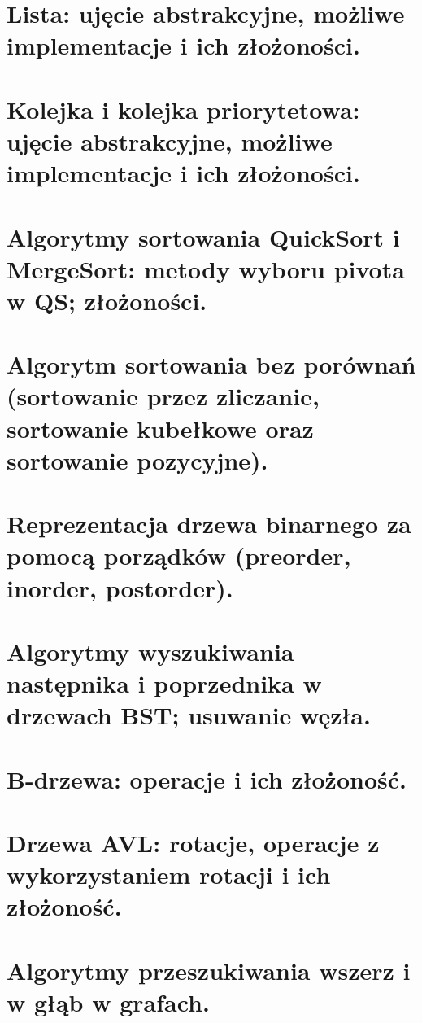 \documentclass[12pt]{article}
\begin{document}
    \section{Lista: ujęcie abstrakcyjne, możliwe implementacje i ich złożoności.}
    \section{Kolejka i kolejka priorytetowa: ujęcie abstrakcyjne, możliwe implementacje i ich złożoności.}

    \newpage

    \section{Algorytmy sortowania QuickSort i MergeSort: metody wyboru pivota w QS; złożoności.}

    \newpage

    \section{Algorytm sortowania bez porównań (sortowanie przez zliczanie, sortowanie kubełkowe oraz sortowanie pozycyjne).}

    \newpage

    \section{Reprezentacja drzewa binarnego za pomocą porządków (preorder, inorder, postorder).}

    \newpage

    \section{Algorytmy wyszukiwania następnika i poprzednika w drzewach BST; usuwanie węzła.}
    \section{B-drzewa: operacje i ich złożoność.}
    \section{Drzewa AVL: rotacje, operacje z wykorzystaniem rotacji i ich złożoność.}
    \section{Algorytmy przeszukiwania wszerz i w głąb w grafach.}
\end{document}
